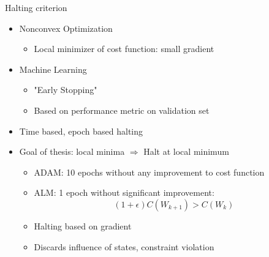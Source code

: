 \documentclass[11pt,t]{beamer}
\begin{document}
\begin{frame}[fragile]{Halting criterion}
	\begin{itemize}
		\item Nonconvex Optimization
			\begin{itemize}
				\item Local minimizer of cost function: small gradient
			\end{itemize}	
		\item Machine Learning
		\begin{itemize}
			\item "Early Stopping"
			\item Based on performance metric on validation set
		\end{itemize}
		\item Time based, epoch based halting
		\item Goal of thesis: local minima $\Rightarrow$ Halt at local minimum
		\begin{itemize}
			\item ADAM: 10 epochs without any improvement to cost function
			\item ALM: 1 epoch without significant improvement:
				\begin{equation*}
				(1+\epsilon)C(W_{k+1}) > C(W_k)
				\end{equation*}
			\item Halting based on gradient
			\item Discards influence of states, constraint violation
		\end{itemize}
	\end{itemize}
\end{frame}
\end{document}
